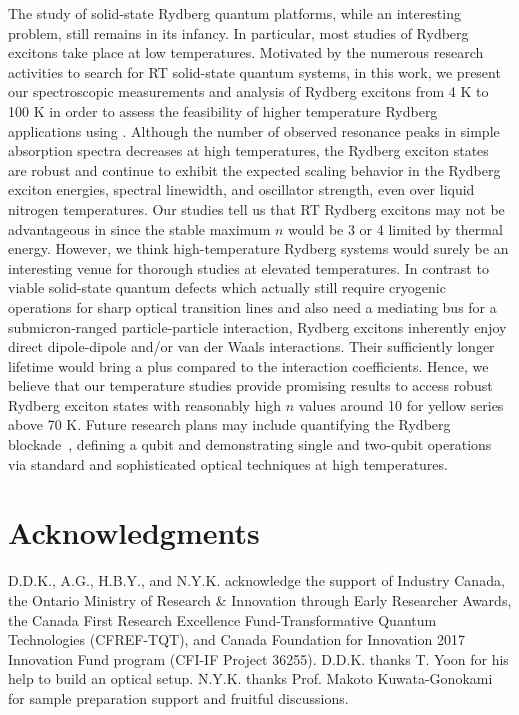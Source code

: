\documentclass[aps,reprint,amsmath,amssymb,prb]{revtex4-1}
\begin{document}
The study of solid-state Rydberg quantum platforms, while an interesting problem, still remains in its infancy. In particular, most studies of Rydberg excitons take place at low temperatures. Motivated by the numerous research activities to search for RT solid-state quantum systems, in this work, we present our spectroscopic measurements and analysis of Rydberg excitons from 4 K to 100 K in order to assess the feasibility of higher temperature Rydberg applications using . Although the number of observed resonance peaks in simple absorption spectra decreases at high temperatures, the Rydberg exciton states are robust and continue to exhibit the expected scaling behavior in the Rydberg exciton energies, spectral linewidth, and oscillator strength, even over liquid nitrogen temperatures. Our studies tell us that RT Rydberg excitons may not be advantageous in  since the stable maximum $n$ would be 3 or 4 limited by thermal energy. However, we think high-temperature Rydberg systems would surely be an interesting venue for thorough studies at elevated temperatures. In contrast to viable solid-state quantum defects which actually still require cryogenic operations for sharp optical transition lines and also need a mediating bus for a submicron-ranged particle-particle interaction, Rydberg excitons inherently enjoy direct dipole-dipole and/or van der Waals interactions. Their sufficiently longer lifetime would bring a plus compared to the interaction coefficients. Hence, we believe that our temperature studies provide promising results to access robust Rydberg exciton states with reasonably high $n$ values around 10 for yellow series above 70 K. Future research plans may include quantifying the Rydberg blockade~\cite{Khazali2017,Heckoetter2020}, defining a qubit and demonstrating single and two-qubit operations via standard and sophisticated optical techniques at high temperatures.



\section*{Acknowledgments}
D.D.K., A.G., H.B.Y., and N.Y.K. acknowledge the support of Industry Canada, the Ontario Ministry of Research \& Innovation through Early Researcher Awards, the Canada First Research Excellence Fund-Transformative Quantum Technologies (CFREF-TQT), and Canada Foundation for Innovation 2017 Innovation Fund program (CFI-IF Project 36255). D.D.K. thanks T. Yoon for his help to build an optical setup. N.Y.K. thanks Prof. Makoto Kuwata-Gonokami for sample preparation support and fruitful discussions.
  
\end{document}
